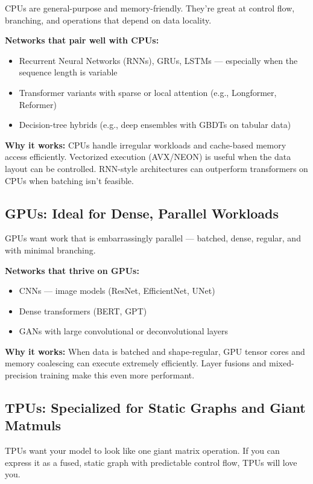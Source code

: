 CPUs are general-purpose and memory-friendly. They're great at control flow, branching, and operations that depend on data locality.

\textbf{Networks that pair well with CPUs:}
\begin{itemize}
    \item Recurrent Neural Networks (RNNs), GRUs, LSTMs — especially when the sequence length is variable
    \item Transformer variants with sparse or local attention (e.g., Longformer, Reformer)
    \item Decision-tree hybrids (e.g., deep ensembles with GBDTs on tabular data)
\end{itemize}

\textbf{Why it works:}  
CPUs handle irregular workloads and cache-based memory access efficiently. Vectorized execution (AVX/NEON) is useful when the data layout can be controlled. RNN-style architectures can outperform transformers on CPUs when batching isn't feasible.

\subsection{GPUs: Ideal for Dense, Parallel Workloads}

GPUs want work that is embarrassingly parallel — batched, dense, regular, and with minimal branching.

\textbf{Networks that thrive on GPUs:}
\begin{itemize}
    \item CNNs — image models (ResNet, EfficientNet, UNet)
    \item Dense transformers (BERT, GPT)
    \item GANs with large convolutional or deconvolutional layers
\end{itemize}

\textbf{Why it works:}  
When data is batched and shape-regular, GPU tensor cores and memory coalescing can execute extremely efficiently. Layer fusions and mixed-precision training make this even more performant.

\subsection{TPUs: Specialized for Static Graphs and Giant Matmuls}

TPUs want your model to look like one giant matrix operation. If you can express it as a fused, static graph with predictable control flow, TPUs will love you.

